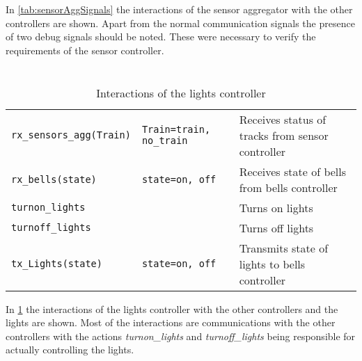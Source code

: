 \documentclass[final]{report}
\begin{document}
In \cref{tab:sensorAggSignals} the interactions of the sensor aggregator with the other controllers are shown.
Apart from the normal communication signals the presence of two debug signals should be noted.
These were necessary to verify the requirements of the sensor controller.

\section{}
\begin{table}[H]
\centering
    \begin{tabular}{|l|l|l|}
    \hline
    \texttt{rx\_sensors\_agg(Train)} & \texttt{Train=train, no\_train} & Receives status of tracks from sensor controller \\
    \texttt{rx\_bells(state)}        & \texttt{state=on, off}          & Receives state of bells from bells controller    \\ \hline
    \texttt{turnon\_lights}          &                                 & Turns on lights                                  \\
    \texttt{turnoff\_lights}         &                                 & Turns off lights                                 \\
    \texttt{tx\_Lights(state)}       & \texttt{state=on, off}          & Transmits state of lights to bells controller    \\ \hline
    \end{tabular}
\caption{Interactions of the lights controller}
\label{tab:lightsSignals}
\end{table}

In \cref{tab:lightsSignals} the interactions of the lights controller with the other controllers and the lights are shown.
Most of the interactions are communications with the other controllers with the actions \textit{turnon\_lights} and \textit{turnoff\_lights} being responsible for actually controlling the lights.
\end{document}
